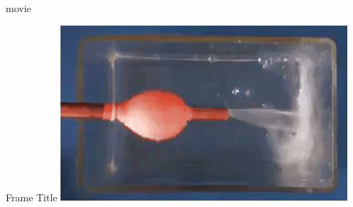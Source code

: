\documentclass{beamer}
\begin{document}
\begin{frame}{movie}
\end{frame}


\begin{frame}{Frame Title}
\includegraphics[width=0.8\textwidth]{images/Beamer/windkessel/1.png}
\end{frame}
 
\end{document}

